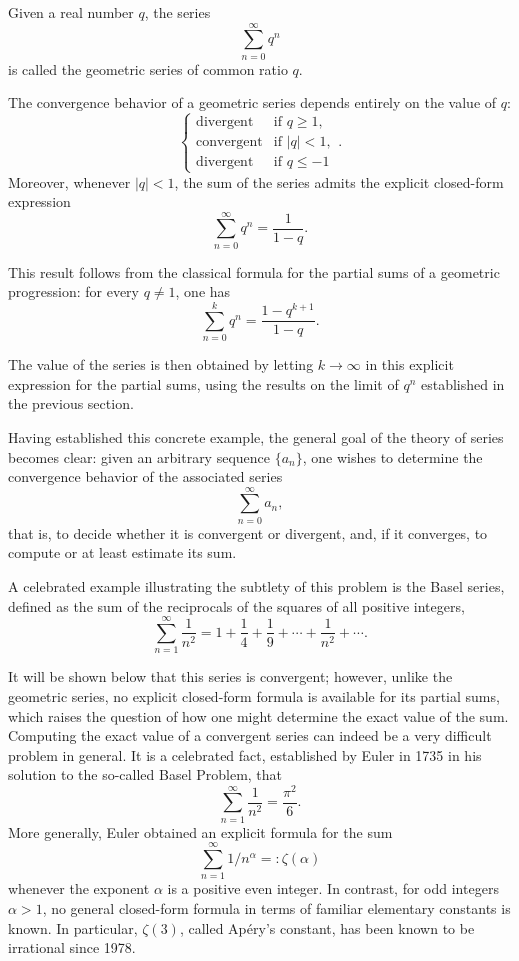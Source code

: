 \begin{definition}
Given a real number $q$, the series \[
\sum_{n=0}^{\infty} q^n
\] is called the geometric series of common ratio $q$.
\end{definition}

The convergence behavior of a geometric series depends entirely on the value of $q$:
\[
\begin{cases}
\text{divergent} & \text{if } q \geq 1, \\
\text{convergent} & \text{if } |q| < 1, \\
\text{divergent} & \text{if } q \leq -1
\end{cases}.
\]
Moreover, whenever $|q| < 1$, the sum of the series admits the explicit closed-form expression
\[
\sum_{n=0}^{\infty} q^n = \frac{1}{1 - q}.
\]

This result follows from the classical formula for the partial sums of a geometric progression: for every $q \neq 1$, one has
\[
\sum_{n=0}^{k} q^n = \frac{1 - q^{k+1}}{1 - q}.
\]

The value of the series is then obtained by letting $k \to \infty$ in this explicit expression for the partial sums, using the results on the limit of $q^n$ established in the previous section.

Having established this concrete example, the general goal of the theory of series becomes clear: given an arbitrary sequence $\{a_n\}$, one wishes to determine the convergence behavior of the associated series
\[
\sum_{n=0}^{\infty} a_n,
\]
that is, to decide whether it is convergent or divergent, and, if it converges, to compute or at least estimate its sum.


A celebrated example illustrating the subtlety of this problem is the Basel series, defined as the sum of the reciprocals of the squares of all positive integers,
\[
\sum_{n=1}^{\infty} \frac{1}{n^2} = 1 + \frac{1}{4} + \frac{1}{9} + \cdots + \frac{1}{n^2} + \cdots.
\]

It will be shown below that this series is convergent; however, unlike the geometric series, no explicit closed-form formula is available for its partial sums, which raises the question of how one might determine the exact value of the sum. Computing the exact value of a convergent series can indeed be a very difficult problem in general. It is a celebrated fact, established by Euler in 1735 in his solution to the so-called Basel Problem, that
\[
\sum_{n=1}^{\infty} \frac{1}{n^2} = \frac{\pi^2}{6}.
\]
More generally, Euler obtained an explicit formula for the sum \[
\sum_{n=1}^{\infty} 1/n^\alpha =: \zeta(\alpha)
\] whenever the exponent $\alpha$ is a positive even integer. In contrast, for odd integers $\alpha>1$, no general closed-form formula in terms of familiar elementary constants is known. In particular, $\zeta(3)$, called Apéry's constant, has been known to be irrational since 1978.

